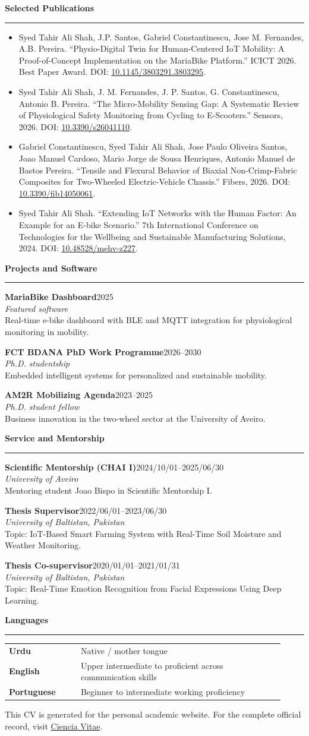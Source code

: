 \documentclass[11pt,a4paper]{article}
\newcommand{\cvsection}[1]{%
  \vspace{8pt}
  {\large\bfseries\color{accent} #1}\\[-2pt]
  \rule{\linewidth}{0.4pt}
  \vspace{2pt}
}
\newcommand{\entry}[4]{%
  \textbf{#1}\hfill{\small #2}\\
  \textit{#3}\\
  #4
  \vspace{4pt}
}
\begin{document}
\cvsection{Selected Publications}
\begin{itemize}
  \item Syed Tahir Ali Shah, J.P. Santos, Gabriel Constantinescu, Jose M. Fernandes, A.B. Pereira. ``Physio-Digital Twin for Human-Centered IoT Mobility: A Proof-of-Concept Implementation on the MariaBike Platform.'' ICICT 2026. Best Paper Award. DOI: \href{https://doi.org/10.1145/3803291.3803295}{10.1145/3803291.3803295}.
  \item Syed Tahir Ali Shah, J. M. Fernandes, J. P. Santos, G. Constantinescu, Antonio B. Pereira. ``The Micro-Mobility Sensing Gap: A Systematic Review of Physiological Safety Monitoring from Cycling to E-Scooters.'' Sensors, 2026. DOI: \href{https://doi.org/10.3390/s26041110}{10.3390/s26041110}.
  \item Gabriel Constantinescu, Syed Tahir Ali Shah, Jose Paulo Oliveira Santos, Joao Manuel Cardoso, Mario Jorge de Sousa Henriques, Antonio Manuel de Bastos Pereira. ``Tensile and Flexural Behavior of Biaxial Non-Crimp-Fabric Composites for Two-Wheeled Electric-Vehicle Chassis.'' Fibers, 2026. DOI: \href{https://doi.org/10.3390/fib14050061}{10.3390/fib14050061}.
  \item Syed Tahir Ali Shah. ``Extending IoT Networks with the Human Factor: An Example for an E-bike Scenario.'' 7th International Conference on Technologies for the Wellbeing and Sustainable Manufacturing Solutions, 2024. DOI: \href{https://doi.org/10.48528/mehv-z227}{10.48528/mehv-z227}.
\end{itemize}

\cvsection{Projects and Software}
\entry{MariaBike Dashboard}{2025}{Featured software}{Real-time e-bike dashboard with BLE and MQTT integration for physiological monitoring in mobility.}
\entry{FCT BDANA PhD Work Programme}{2026--2030}{Ph.D. studentship}{Embedded intelligent systems for personalized and sustainable mobility.}
\entry{AM2R Mobilizing Agenda}{2023--2025}{Ph.D. student fellow}{Business innovation in the two-wheel sector at the University of Aveiro.}

\cvsection{Service and Mentorship}
\entry{Scientific Mentorship (CHAI I)}{2024/10/01--2025/06/30}{University of Aveiro}{Mentoring student Joao Bispo in Scientific Mentorship I.}
\entry{Thesis Supervisor}{2022/06/01--2023/06/30}{University of Baltistan, Pakistan}{Topic: IoT-Based Smart Farming System with Real-Time Soil Moisture and Weather Monitoring.}
\entry{Thesis Co-supervisor}{2020/01/01--2021/01/31}{University of Baltistan, Pakistan}{Topic: Real-Time Emotion Recognition from Facial Expressions Using Deep Learning.}

\cvsection{Languages}
\begin{tabular}{>{\bfseries}p{0.24\linewidth}p{0.68\linewidth}}
Urdu & Native / mother tongue\\
English & Upper intermediate to proficient across communication skills\\
Portuguese & Beginner to intermediate working proficiency\\
\end{tabular}

\vfill
{\small This CV is generated for the personal academic website. For the complete official record, visit \href{https://www.cienciavitae.pt//F712-C83E-0EFB}{Ciencia Vitae}.}
\end{document}
